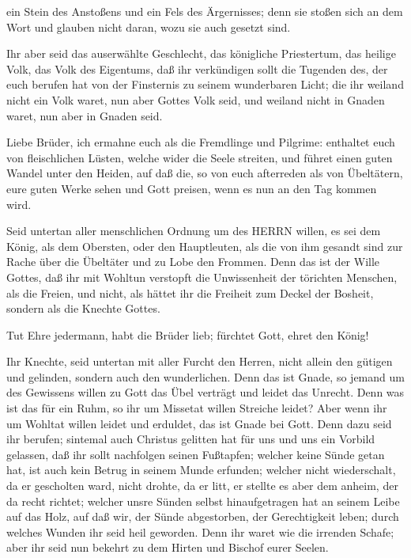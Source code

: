  ein Stein des Anstoßens und ein Fels des Ärgernisses; denn
sie stoßen sich an dem Wort und glauben nicht daran, wozu sie auch
gesetzt sind.

 Ihr aber seid das auserwählte Geschlecht, das königliche
Priestertum, das heilige Volk, das Volk des Eigentums, daß ihr
verkündigen sollt die Tugenden des, der euch berufen hat von der
Finsternis zu seinem wunderbaren Licht;  die ihr weiland
nicht ein Volk waret, nun aber Gottes Volk seid, und weiland nicht in
Gnaden waret, nun aber in Gnaden seid.

 Liebe Brüder, ich ermahne euch als die Fremdlinge und
Pilgrime: enthaltet euch von fleischlichen Lüsten, welche wider die
Seele streiten,  und führet einen guten Wandel unter den
Heiden, auf daß die, so von euch afterreden als von Übeltätern, eure
guten Werke sehen und Gott preisen, wenn es nun an den Tag kommen wird.

 Seid untertan aller menschlichen Ordnung um des HERRN
willen, es sei dem König, als dem Obersten,  oder den
Hauptleuten, als die von ihm gesandt sind zur Rache über die Übeltäter
und zu Lobe den Frommen.  Denn das ist der Wille Gottes,
daß ihr mit Wohltun verstopft die Unwissenheit der törichten Menschen,
 als die Freien, und nicht, als hättet ihr die Freiheit zum
Deckel der Bosheit, sondern als die Knechte Gottes.

 Tut Ehre jedermann, habt die Brüder lieb; fürchtet Gott,
ehret den König!

 Ihr Knechte, seid untertan mit aller Furcht den Herren,
nicht allein den gütigen und gelinden, sondern auch den wunderlichen.
 Denn das ist Gnade, so jemand um des Gewissens willen zu
Gott das Übel verträgt und leidet das Unrecht.  Denn was
ist das für ein Ruhm, so ihr um Missetat willen Streiche leidet? Aber
wenn ihr um Wohltat willen leidet und erduldet, das ist Gnade bei Gott.
 Denn dazu seid ihr berufen; sintemal auch Christus
gelitten hat für uns und uns ein Vorbild gelassen, daß ihr sollt
nachfolgen seinen Fußtapfen;  welcher keine Sünde getan
hat, ist auch kein Betrug in seinem Munde erfunden; 
welcher nicht wiederschalt, da er gescholten ward, nicht drohte, da er
litt, er stellte es aber dem anheim, der da recht richtet; 
welcher unsre Sünden selbst hinaufgetragen hat an seinem Leibe auf das
Holz, auf daß wir, der Sünde abgestorben, der Gerechtigkeit leben; durch
welches Wunden ihr seid heil geworden.  Denn ihr waret wie
die irrenden Schafe; aber ihr seid nun bekehrt zu dem Hirten und Bischof
eurer Seelen.

